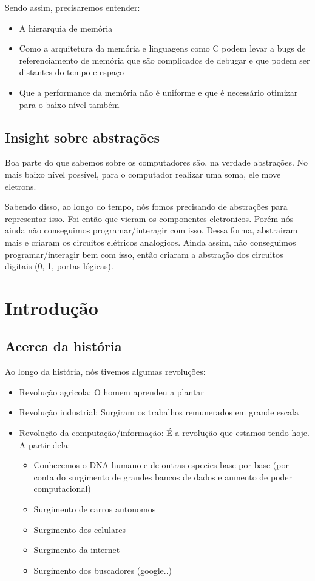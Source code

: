 \documentclass[12pt,a4paper]{report}
\begin{document}
	Sendo assim, precisaremos entender:
	\begin{itemize}
		\item A hierarquia de memória
		\item Como a arquitetura da memória
		e linguagens como C podem levar a bugs de referenciamento de memória que são complicados de debugar e que podem ser distantes do tempo e espaço
		\item Que a performance da memória
		não é uniforme e que é necessário otimizar
		para o baixo nível também
	\end{itemize}  
	
	\section{Insight sobre abstrações}
	Boa parte do que sabemos sobre os computadores são, na verdade abstrações. No mais baixo nível possível, para o computador realizar uma soma, ele move eletrons.
	
	Sabendo disso, ao longo do tempo, nós fomos precisando de abstrações para representar isso. Foi então que vieram os componentes eletronicos. Porém nós ainda não conseguimos programar/interagir com isso. Dessa forma, abstrairam mais e criaram os circuitos elétricos analogicos. Ainda assim, não conseguimos programar/interagir bem com isso, então criaram a abstração dos circuitos digitais (0, 1, portas lógicas).
	
	\chapter{Introdução}
	\section{Acerca da história}
	
	Ao longo da história, nós tivemos algumas revoluções:
	
	\begin{itemize}
		\item Revolução agricola: O homem aprendeu a plantar
		\item Revolução industrial: Surgiram os trabalhos remunerados em grande escala
		\item Revolução da computação/informação: É a revolução que estamos tendo hoje. A partir dela:
		\begin{itemize}
			\item Conhecemos o DNA humano e de outras especies base por base (por conta do surgimento de grandes bancos de dados e aumento de poder computacional)
			\item Surgimento de carros autonomos
			\item Surgimento dos celulares
			\item Surgimento da internet
			\item Surgimento dos buscadores (google..)
		\end{itemize}
	\end{itemize}
	
\end{document}
